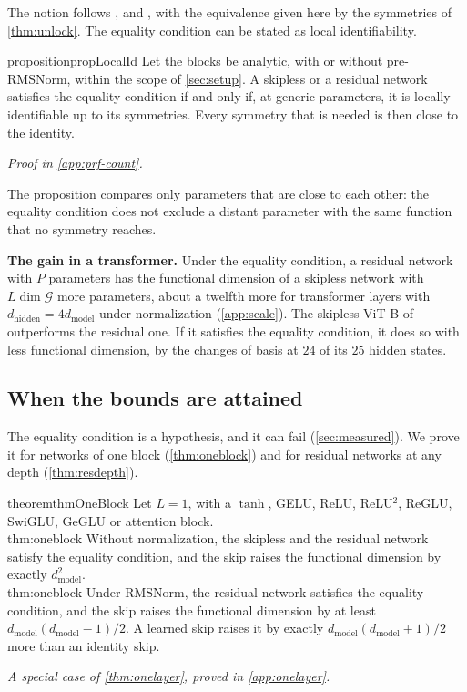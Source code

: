\documentclass[10pt]{article}
\theoremstyle{definition}
\theoremstyle{remark}
\newcommand{\dm}{d_{\mathrm{model}}}
\newcommand{\dhid}{d_{\mathrm{hidden}}}
\newcommand{\G}{\mathcal{G}}
\newcommand{\para}[1]{\smallskip\noindent\textbf{#1}\hspace{0.5em}}
\newcommand{\ptlabel}[1]{\phantomsection\label{#1}}
\newcommand{\proofin}[1]{\par\vspace{-0.4\baselineskip}\noindent\hfill{\small\itshape Proof in \cref{#1}.}\par\smallskip}
\newcommand{\specialof}[2]{\par\vspace{-0.4\baselineskip}\noindent\hfill{\small\itshape A special case of \cref{#1}, proved in \cref{#2}.}\par\smallskip}
\newcommand{\stpart}[3]{\ifx\relax#1\relax\else\ptlabel{#1:#2}\fi{\upshape\bfseries\boldmath(#2)\ifx\relax#3\relax\else\ #3.\fi}}
\begin{document}
The notion follows \citet{vlacic2020affine}, \citet{stock2021embedding} and \citet{bonapellissier2022local}, with the equivalence given here by the symmetries of \cref{thm:unlock}. The equality condition can be stated as local identifiability.

\begin{restatable}{proposition}{propLocalId}\label{prop:localid}
Let the blocks be analytic, with or without pre-RMSNorm, within the scope of \cref{sec:setup}. A skipless or a residual network satisfies the equality condition if and only if, at generic parameters, it is locally identifiable up to its symmetries. Every symmetry that is needed is then close to the identity.
\end{restatable}
\proofin{app:prf-count}

The proposition compares only parameters that are close to each other: the equality condition does not exclude a distant parameter with the same function that no symmetry reaches.

\para{The gain in a transformer.} Under the equality condition, a residual network with $P$ parameters has the functional dimension of a skipless network with $L\dim\G$ more parameters, about a twelfth more for transformer layers with $\dhid = 4\dm$ under normalization (\cref{app:scale}). The skipless ViT-B of \citet{ji2026cutting} outperforms the residual one. If it satisfies the equality condition, it does so with less functional dimension, by the changes of basis at $24$ of its $25$ hidden states.

\subsection{When the bounds are attained}\label{sec:onelayer}

The equality condition is a hypothesis, and it can fail (\cref{sec:measured}). We prove it for networks of one block (\cref{thm:oneblock}) and for residual networks at any depth (\cref{thm:resdepth}).

\begin{restatable}{theorem}{thmOneBlock}\label{thm:oneblock}
Let $L = 1$, with a $\tanh$, GELU, ReLU, ReLU$^2$, ReGLU, SwiGLU, GeGLU or attention block.\\
\stpart{thm:oneblock}{i}{} Without normalization, the skipless and the residual network satisfy the equality condition, and the skip raises the functional dimension by exactly $\dm^2$.\\
\stpart{thm:oneblock}{ii}{} Under RMSNorm, the residual network satisfies the equality condition, and the skip raises the functional dimension by at least $\dm(\dm-1)/2$. A learned skip raises it by exactly $\dm(\dm+1)/2$ more than an identity skip.
\end{restatable}
\specialof{thm:onelayer}{app:onelayer}
\end{document}
